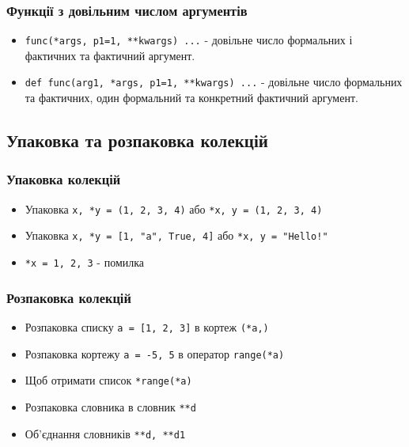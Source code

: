 \begin{frame}
\frametitle{Функції з довільним числом аргументів}
\begin{itemize}
  \item \texttt{func(*args, p1=1, **kwargs) ...} - довільне число формальних і фактичних та фактичний аргумент.
   \item \texttt{def func(arg1, *args, p1=1, **kwargs) ...}  - довільне число формальних та фактичних, один формальний та конкретний фактичний аргумент.
\end{itemize}

\end{frame}

\subsection{Упаковка та розпаковка колекцій} 
\begin{frame}
\frametitle{Упаковка колекцій}
\begin{itemize}
  \item Упаковка \texttt{x, *y = (1, 2, 3, 4)} або \texttt{*x, y = (1, 2, 3, 4)}
  \item Упаковка \texttt{x, *y = [1, "a", True, 4]} або \texttt{*x, y = "Hello!"}
  \item \texttt{*x = 1, 2, 3} - помилка
\end{itemize}

\end{frame}

\begin{frame}
\frametitle{Розпаковка колекцій}
\begin{itemize}
  \item Розпаковка списку \texttt{a = [1, 2, 3]} в кортеж \texttt{(*a,)}
  \item Розпаковка кортежу \texttt{a = -5, 5} в оператор \texttt{range(*a)}
  \item Щоб отримати список \texttt{*range(*a)}
  \item Розпаковка словника в словник \texttt{**d}
  \item Об'єднання словників \texttt{**d, **d1} 
\end{itemize}

\end{frame}
